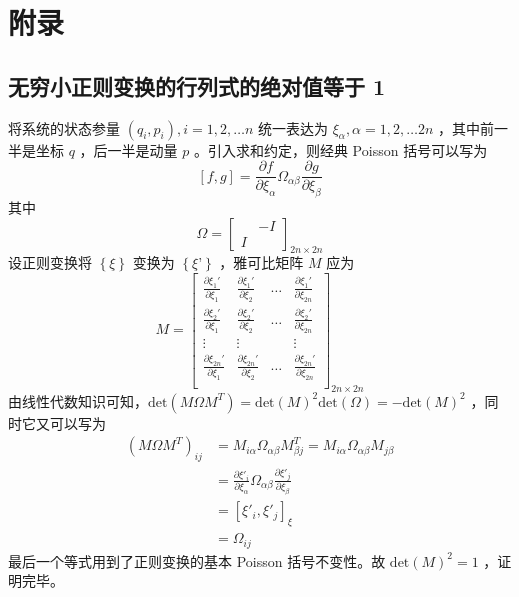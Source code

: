 \documentclass[hyperref,UTF-8]{ctexart}
\newcommand{\0}{\boldsymbol{0}}
\begin{document}
    
    
\section{附录}
\subsection{无穷小正则变换的行列式的绝对值等于 1}
将系统的状态参量 $(q_i,p_i), i = 1,2,\dots n$ 统一表达为 $\xi_\alpha, \alpha = 1,2,\dots 2n$ ，其中前一半是坐标 $q$ ，后一半是动量 $p$ 。引入求和约定，则经典 Poisson 括号可以写为
\[
    [f, g] = \frac{\partial f}{\partial \xi_\alpha}\Omega_{\alpha\beta}\frac{\partial g}{\partial \xi_\beta}
\]
其中
\[
    \Omega = \begin{bmatrix}
        & -I\\
        I&
    \end{bmatrix}_{2n\times 2n}
\]
设正则变换将 $\left \{ \xi \right \}$ 变换为 $\left \{ \xi’ \right \}$ ，雅可比矩阵 $M$ 应为
\[
    M = \begin{bmatrix}
        \frac{\partial \xi_1'}{\partial \xi_1} & \frac{\partial \xi_1'}{\partial \xi_2} & \dots  & \frac{\partial \xi_1'}{\partial \xi_{2n}} \\
        \frac{\partial \xi_2'}{\partial \xi_1} & \frac{\partial \xi_2'}{\partial \xi_2} & \dots  & \frac{\partial \xi_2'}{\partial \xi_{2n}} \\
        \vdots & \vdots &  & \vdots\\
        \frac{\partial \xi_{2n}'}{\partial \xi_1} & \frac{\partial \xi_{2n}'}{\partial \xi_2} & \dots  & \frac{\partial \xi_{2n}'}{\partial \xi_{2n}} \\
    \end{bmatrix}_{2n\times 2n}
\]
由线性代数知识可知，$\text{det}(M\Omega M^T) = \text{det}(M)^2 \text{det}(\Omega) = - \text{det}(M)^2$ ，同时它又可以写为
\begin{align*}
    (M\Omega M^T)_{ij} &= M_{i\alpha}\Omega_{\alpha\beta}M^T_{\beta j}
    = M_{i\alpha}\Omega_{\alpha\beta}M_{j\beta}\\
    &= \frac{\partial \xi'_i}{\partial \xi_\alpha}\Omega_{\alpha\beta}\frac{\partial \xi'_j}{\partial \xi_\beta}\\
    &= [\xi'_i, \xi'_j]_\xi\\
    &= \Omega_{ij}
\end{align*}
最后一个等式用到了正则变换的基本 Poisson 括号不变性。故 $\text{det}(M)^2 = 1$ ，证明完毕。
    
    


\end{document}
